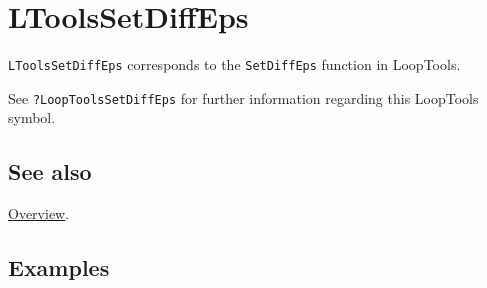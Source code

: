 \documentclass[../FeynHelpersManual.tex]{subfiles}
\begin{document}
\hypertarget{ltoolssetdiffeps}{
\section{LToolsSetDiffEps}\label{ltoolssetdiffeps}}

\texttt{LToolsSetDiffEps} corresponds to the \texttt{SetDiffEps}
function in LoopTools.

See \texttt{?LoopTools\textasciigrave SetDiffEps} for further
information regarding this LoopTools symbol.

\subsection{See also}

\hyperlink{toc}{Overview}.

\subsection{Examples}
\end{document}
